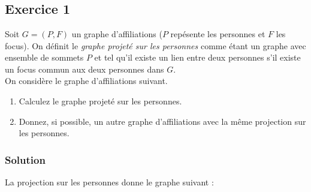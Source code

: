 \section{}


\subsection*{Exercice 1}
Soit $G = (P, F)$ un graphe d'affiliations ($P$ rep\'{e}sente les personnes et $F$ les focus). On d\'{e}finit le \emph{graphe projet\'{e} sur les personnes} comme \'{e}tant un graphe avec ensemble de sommets $P$ et tel qu'il existe un lien entre deux personnes s'il existe un focus commun aux deux personnes dans $G$. \\

On consid\`{e}re le graphe d'affiliations suivant.
\begin{center}
\end{center}

\begin{enumerate}
\item Calculez le graphe projet\'{e} sur les personnes.

\item Donnez, si possible, un autre graphe d'affiliations avec la m\^{e}me projection sur les personnes.
\end{enumerate}

    \subsubsection*{Solution}
    La projection sur les personnes donne le graphe suivant :
    
